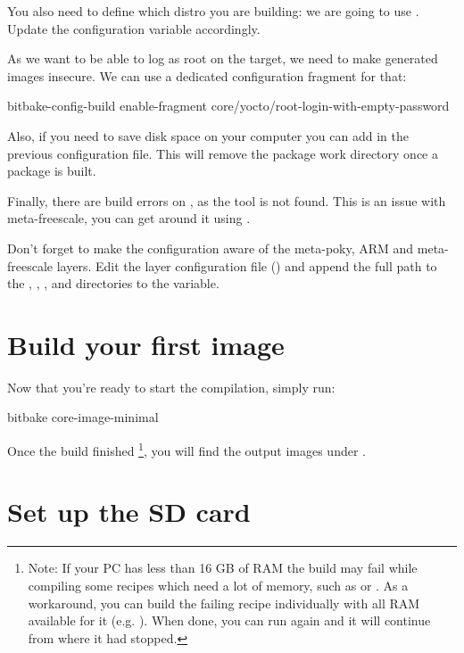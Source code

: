 You also need to define which distro you are building: we are going to use
.
Update the  configuration variable accordingly.

As we want to be able to log as root on the target, we need to make generated
images insecure. We can use a dedicated configuration fragment for that:
\begin{bashinput}
bitbake-config-build enable-fragment core/yocto/root-login-with-empty-password
\end{bashinput}

Also, if you need to save disk space on your computer you can add  in the previous configuration file. This will remove the
package work directory once a package is built.

Finally, there are build errors on , as the
 tool is not found. This is an issue with
meta-freescale, you can get around it using .

Don't forget to make the configuration aware of the meta-poky, ARM and
meta-freescale layers.
Edit the layer configuration file () and
append the full path to the
,
,
,
and 
directories to the  variable.

\section{Build your first image}

Now that you're ready to start the compilation, simply run:
\begin{bashinput}
bitbake core-image-minimal
\end{bashinput}

Once the build finished%
%
\footnote{Note: If your PC has less than 16 GB of
RAM the build may fail while compiling some recipes which need a lot of
memory, such as  or . As a
workaround, you can build the failing recipe individually with all RAM
available for it (e.g. ). When done, you can
run  again and it will continue from where
it had stopped.},
%
you will find the output images under
.

\section{Set up the SD card}

